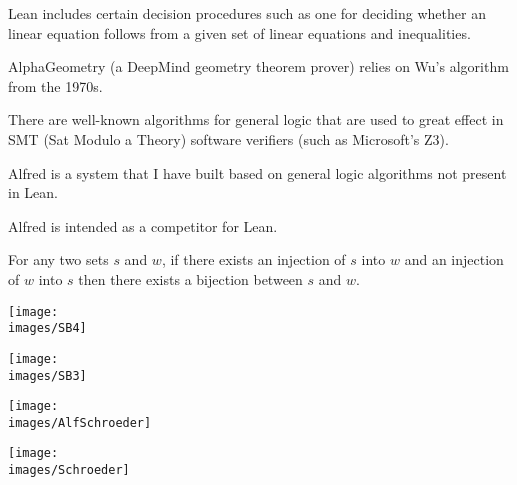{\vfill
Lean includes certain decision procedures such as one for deciding whether an linear equation
follows from a given set of linear equations and inequalities.

\vfill
AlphaGeometry (a DeepMind geometry theorem prover) relies on Wu's algorithm from the 1970s.


There are well-known algorithms for general logic that are used to great effect in SMT (Sat Modulo a Theory) software verifiers
(such as Microsoft's Z3).

\vfill
Alfred is a system that I have built based on general logic algorithms not present in Lean.

\vfill
Alfred is intended as a competitor for Lean.


For any two sets $s$ and $w$, if there exists an injection of $s$ into $w$ and an injection of $w$ into $s$ then there exists a bijection between $s$ and $w$.


\centerline{\texttt{[image: \\images/SB4]}}


\centerline{\texttt{[image: \\images/SB3]}}



\centerline{\texttt{[image: \\images/AlfSchroeder]}}


\centerline{\texttt{[image: \\images/Schroeder]}}


}




